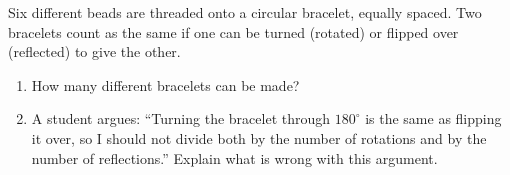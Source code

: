 Six different beads are threaded onto a circular bracelet, equally spaced. Two bracelets count as the same if one can be turned (rotated) or flipped over (reflected) to give the other.
\begin{enumerate}
\item[(a)] How many different bracelets can be made?
\item[(b)] A student argues: ``Turning the bracelet through $180^\circ$ is the same as flipping it over, so I should not divide both by the number of rotations and by the number of reflections.'' Explain what is wrong with this argument.
\end{enumerate}

